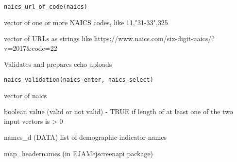 \documentclass[a4paper]{book}
\begin{document}
%
\begin{Usage}
\begin{verbatim}
naics_url_of_code(naics)
\end{verbatim}
\end{Usage}
%
\begin{Arguments}
\begin{ldescription}
\item[\code{naics}] vector of one or more NAICS codes, like 11,"31-33",325
\end{ldescription}
\end{Arguments}
%
\begin{Value}
vector of URLs as strings like https://www.naics.com/six-digit-naics/?v=2017\&code=22
\end{Value}
%
\begin{Description}\relax
Validates and prepares echo uploads
\end{Description}
%
\begin{Usage}
\begin{verbatim}
naics_validation(naics_enter, naics_select)
\end{verbatim}
\end{Usage}
%
\begin{Arguments}
\begin{ldescription}
\item[\code{naics\_enter}] vector of naics

\item[\code{naics\_select}] 
\end{ldescription}
\end{Arguments}
%
\begin{Value}
boolean value (valid or not valid) - TRUE if
length of at least one of the two input vectors is > 0
\end{Value}
%
\begin{Description}\relax
names\_d (DATA) list of demographic indicator names
\end{Description}
%
\begin{SeeAlso}\relax
map\_headernames (in EJAMejscreenapi package)   
\end{SeeAlso}
\end{document}
